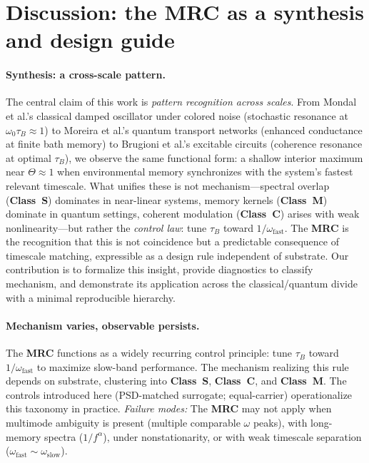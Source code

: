 \documentclass[11pt,letterpaper]{article}
\DeclareRobustCommand{\mrc}{\textbf{MRC}\xspace}
\DeclareRobustCommand{\classS}{\textbf{Class~S}\xspace}
\DeclareRobustCommand{\classC}{\textbf{Class~C}\xspace}
\DeclareRobustCommand{\classM}{\textbf{Class~M}\xspace}
\begin{document}
\section{Discussion: the \mrc as a synthesis and design guide}

\paragraph*{Synthesis: a cross-scale pattern.}
The central claim of this work is \emph{pattern recognition across scales}. From Mondal et al.'s classical damped oscillator under colored noise (stochastic resonance at $\omega_0\tau_B\!\approx\!1$) to Moreira et al.'s quantum transport networks (enhanced conductance at finite bath memory) to Brugioni et al.'s excitable circuits (coherence resonance at optimal $\tau_B$), we observe the same functional form: a shallow interior maximum near $\Theta\!\approx\!1$ when environmental memory synchronizes with the system's fastest relevant timescale. What unifies these is not mechanism---spectral overlap (\classS) dominates in near-linear systems, memory kernels (\classM) dominate in quantum settings, coherent modulation (\classC) arises with weak nonlinearity---but rather the \emph{control law}: tune $\tau_B$ toward $1/\omega_{\mathrm{fast}}$. The \mrc is the recognition that this is not coincidence but a predictable consequence of timescale matching, expressible as a design rule independent of substrate. Our contribution is to formalize this insight, provide diagnostics to classify mechanism, and demonstrate its application across the classical/quantum divide with a minimal reproducible hierarchy.

\paragraph*{Mechanism varies, observable persists.}
The \mrc functions as a widely recurring control principle: tune $\tau_B$ toward $1/\omega_{\mathrm{fast}}$ to maximize slow-band performance. The mechanism realizing this rule depends on substrate, clustering into \classS{}, \classC{}, and \classM{}. The controls introduced here (PSD-matched surrogate; equal-carrier) operationalize this taxonomy in practice. \emph{Failure modes:} The \mrc may not apply when multimode ambiguity is present (multiple comparable $\omega$ peaks), with long-memory spectra ($1/f^\alpha$), under nonstationarity, or with weak timescale separation ($\omega_{\mathrm{fast}}\sim\omega_{\mathrm{slow}}$).
\end{document}
